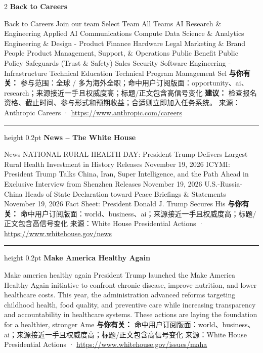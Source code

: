 \documentclass[10.5pt]{ctexart}
\begin{document}
\begin{multicols}{2}
{\large\bfseries Back to Careers}\par
Back to Careers Join our team Select Team All Teams AI Research \& Engineering Applied AI Communications Compute Data Science \& Analytics Engineering \& Design - Product Finance Hardware Legal Marketing \& Brand People Product Management, Support, \& Operations Public Benefit Public Policy Safeguards (Trust \& Safety) Sales Security Software Engineering - Infrastructure Technical Education Technical Program Management Sel
\textbf{与你有关：} 参与范围：全球 / 多为海外全职；命中用户订阅版面：opportunity、ai、research；来源接近一手且权威度高；标题/正文包含高信号变化
\textbf{建议：} 检查报名资格、截止时间、参与形式和预期收益；合适则立即加入任务系统。
{\footnotesize\color{ormuted} 来源：Anthropic Careers · \url{https://www.anthropic.com/careers}}
\vspace{2mm}
\hrule height 0.2pt
\vspace{2mm}
{\large\bfseries News – The White House}\par
News NATIONAL RURAL HEALTH DAY: President Trump Delivers Largest Rural Health Investment in History Releases November 19, 2026 ICYMI: President Trump Talks China, Iran, Super Intelligence, and the Path Ahead in Exclusive Interview from Shenzhen Releases November 19, 2026 U.S.-Russia-China Heads of State Declaration toward Peace Briefings \& Statements November 19, 2026 Fact Sheet: President Donald J. Trump Secures His
\textbf{与你有关：} 命中用户订阅版面：world、business、ai；来源接近一手且权威度高；标题/正文包含高信号变化
{\footnotesize\color{ormuted} 来源：White House Presidential Actions · \url{https://www.whitehouse.gov/news}}
\vspace{2mm}
\hrule height 0.2pt
\vspace{2mm}
{\large\bfseries Make America Healthy Again}\par
Make america healthy again President Trump launched the Make America Healthy Again initiative to confront chronic disease, improve nutrition, and lower healthcare costs. This year, the administration advanced reforms targeting childhood health, food quality, and preventive care while increasing transparency and accountability in healthcare systems. These actions are laying the foundation for a healthier, stronger Ame
\textbf{与你有关：} 命中用户订阅版面：world、business、ai；来源接近一手且权威度高；标题/正文包含高信号变化
{\footnotesize\color{ormuted} 来源：White House Presidential Actions · \url{https://www.whitehouse.gov/issues/maha}}

\end{multicols}
\end{document}
